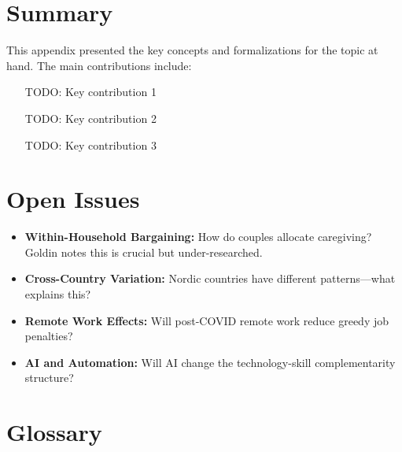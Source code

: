 
\section{Summary}
\label{sec:summary}

This appendix presented the key concepts and formalizations for the topic at hand.
The main contributions include:

\begin{itemize}
    \item [TODO: Key contribution 1]
    \item [TODO: Key contribution 2]
    \item [TODO: Key contribution 3]
\end{itemize}

\section{Open Issues}

\begin{itemize}
    \item \textbf{Within-Household Bargaining:} How do couples allocate
    caregiving? Goldin notes this is crucial but under-researched.

    \item \textbf{Cross-Country Variation:} Nordic countries have different
    patterns---what explains this?

    \item \textbf{Remote Work Effects:} Will post-COVID remote work reduce
    greedy job penalties?

    \item \textbf{AI and Automation:} Will AI change the technology-skill
    complementarity structure?
\end{itemize}

\section{Glossary}

